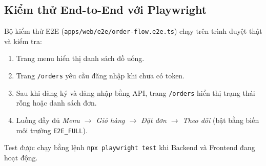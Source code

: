 \subsection{Kiểm thử End-to-End với Playwright}
\label{sec:e2e}

Bộ kiểm thử E2E (\texttt{apps/web/e2e/order-flow.e2e.ts}) chạy trên trình duyệt thật và kiểm tra:

\begin{enumerate}
  \item Trang menu hiển thị danh sách đồ uống.
  \item Trang \texttt{/orders} yêu cầu đăng nhập khi chưa có token.
  \item Sau khi đăng ký và đăng nhập bằng API, trang \texttt{/orders} hiển thị trạng thái rỗng hoặc danh sách đơn.
  \item Luồng đầy đủ \textit{Menu $\rightarrow$ Giỏ hàng $\rightarrow$ Đặt đơn $\rightarrow$ Theo dõi} (bật bằng biến môi trường \texttt{E2E\_FULL}).
\end{enumerate}

Test được chạy bằng lệnh \texttt{npx playwright test} khi Backend và Frontend đang hoạt động.
